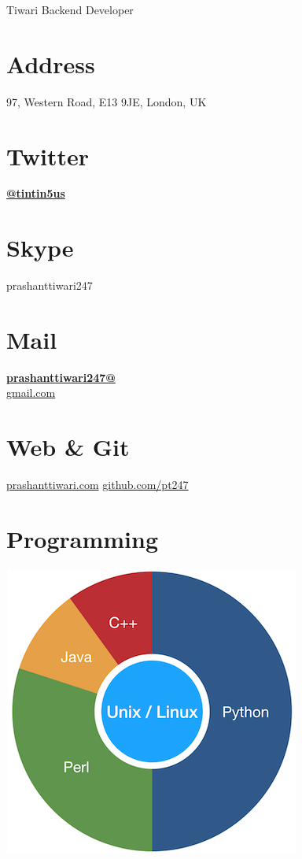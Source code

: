 \documentclass[]{friggeri-cv}
\begin{document}
 {Tiwari}
      {Backend Developer}
      

\begin{aside}
  \section{Address}
    97, Western Road,
    E13 9JE, London, UK
    ~
  \section{Twitter}
    \href{https://twitter.com/tintin5us}{\textbf{@tintin5us}}
    ~
  \section{Skype}
    prashanttiwari247
    ~
  \section{Mail}
    \href{mailto:prashanttiwari247@gmail.com}{\textbf{prashanttiwari247@}\\gmail.com}
    ~
  \section{Web \& Git}
    \href{http://www.prashanttiwari.com}{prashanttiwari.com}
    \href{https://github.com/pt247}{github.com/pt247}
    ~
  \section{Programming}
    \includegraphics[scale=0.62]{img/programming.png}
    ~

\end{aside}
\end{document}
